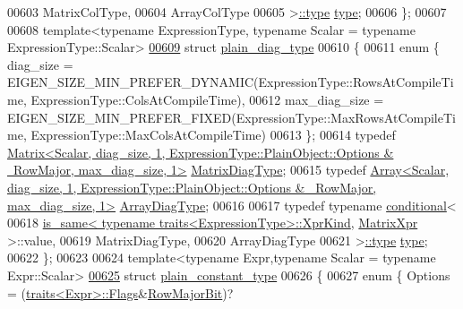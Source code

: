 \begin{DoxyCode}
{00603     MatrixColType,
00604     ArrayColType 
00605   >\hyperlink{class_eigen_1_1internal_1_1_tensor_lazy_evaluator_writable}{::type} \hyperlink{class_eigen_1_1internal_1_1_tensor_lazy_evaluator_writable}{type};
00606 \};
00607 
00608 \textcolor{keyword}{template}<\textcolor{keyword}{typename} ExpressionType, \textcolor{keyword}{typename} Scalar = \textcolor{keyword}{typename} ExpressionType::Scalar>
\hyperlink{struct_eigen_1_1internal_1_1plain__diag__type}{00609} \textcolor{keyword}{struct }\hyperlink{struct_eigen_1_1internal_1_1plain__diag__type}{plain\_diag\_type}
00610 \{
00611   \textcolor{keyword}{enum} \{ diag\_size = EIGEN\_SIZE\_MIN\_PREFER\_DYNAMIC(ExpressionType::RowsAtCompileTime, 
      ExpressionType::ColsAtCompileTime),
00612          max\_diag\_size = EIGEN\_SIZE\_MIN\_PREFER\_FIXED(ExpressionType::MaxRowsAtCompileTime, 
      ExpressionType::MaxColsAtCompileTime)
00613   \};
00614   \textcolor{keyword}{typedef} 
      \hyperlink{group___core___module_class_eigen_1_1_matrix}{Matrix<Scalar, diag\_size, 1, ExpressionType::PlainObject::Options & ~RowMajor, max\_diag\_size, 1>}
       \hyperlink{group___core___module_class_eigen_1_1_matrix}{MatrixDiagType};
00615   \textcolor{keyword}{typedef} 
      \hyperlink{group___core___module_class_eigen_1_1_array}{Array<Scalar, diag\_size, 1, ExpressionType::PlainObject::Options & ~RowMajor, max\_diag\_size, 1>}
       \hyperlink{group___core___module_class_eigen_1_1_array}{ArrayDiagType};
00616 
00617   \textcolor{keyword}{typedef} \textcolor{keyword}{typename} \hyperlink{struct_eigen_1_1internal_1_1conditional}{conditional}<
00618     \hyperlink{struct_eigen_1_1internal_1_1is__same}{is\_same< typename traits<ExpressionType>::XprKind}, 
      \hyperlink{struct_eigen_1_1_matrix_xpr}{MatrixXpr} >::value,
00619     MatrixDiagType,
00620     ArrayDiagType 
00621   >\hyperlink{class_eigen_1_1internal_1_1_tensor_lazy_evaluator_writable}{::type} \hyperlink{class_eigen_1_1internal_1_1_tensor_lazy_evaluator_writable}{type};
00622 \};
00623 
00624 \textcolor{keyword}{template}<\textcolor{keyword}{typename} Expr,\textcolor{keyword}{typename} Scalar = \textcolor{keyword}{typename} Expr::Scalar>
\hyperlink{struct_eigen_1_1internal_1_1plain__constant__type}{00625} \textcolor{keyword}{struct }\hyperlink{struct_eigen_1_1internal_1_1plain__constant__type}{plain\_constant\_type}
00626 \{
00627   \textcolor{keyword}{enum} \{ Options = (\hyperlink{struct_eigen_1_1internal_1_1traits}{traits<Expr>::Flags}&\hyperlink{group__flags_gae4f56c2a60bbe4bd2e44c5b19cbe8762}{RowMajorBit})?
}
\end{DoxyCode}
